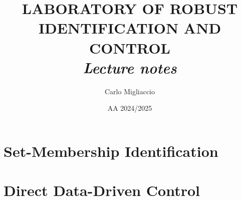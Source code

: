 \documentclass[a4paper, 12pt]{report}
\title{
    {\color{black}
    \textbf{  \Huge{  LABORATORY OF ROBUST IDENTIFICATION AND CONTROL } }\\}
    \textit{Lecture notes}
    \linespread{2}
}
\author{Carlo Migliaccio}
\date{AA 2024/2025}
\theoremstyle{definition}
\theoremstyle{remark}
\begin{document}
\maketitle
\tableofcontents

\part{Set-Membership Identification}


\part{Direct Data-Driven Control}
\end{document}
